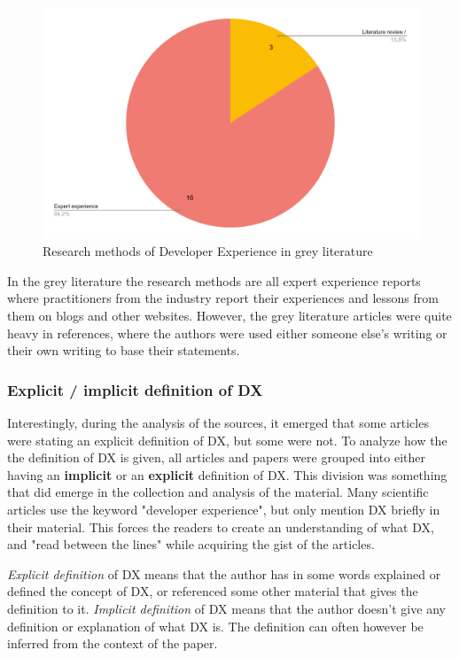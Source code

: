 \documentclass[english, 12pt, a4paper, sci, utf8, a-1b, online]{aaltothesis}
\begin{document}
\begin{figure}[ht]
  \captionsetup{width=0.6\textwidth}
  \begin{center}
    \caption{Research methods of Developer Experience in grey literature}
    \includegraphics[width=\textwidth]{research-methods-grey.pdf}
  \end{center}
\end{figure}

In the grey literature the research methods are all expert experience reports where practitioners from the industry report their experiences and lessons from them on blogs and other websites. However, the grey literature articles were quite heavy in references, where the authors were used either someone else's writing or their own writing to base their statements.

\subsubsection{Explicit / implicit definition of DX}

Interestingly, during the analysis of the sources, it emerged that some articles were stating an explicit definition of DX, but some were not. To analyze how the the definition of DX is given, all articles and papers were grouped into either having an \textbf{implicit} or an \textbf{explicit} definition of DX. This division was something that did emerge in the collection and analysis of the material. Many scientific articles use the keyword "developer experience", but only mention DX briefly in their material. This forces the readers to create an understanding of what DX, and "read between the lines" while acquiring the gist of the articles.

\textit{Explicit definition} of DX means that the author has in some words explained or defined the concept of DX, or referenced some other material that gives the definition to it. \textit{Implicit definition} of DX means that the author doesn't give any definition or explanation of what DX is. The definition can often however be inferred from the context of the paper.
\end{document}

